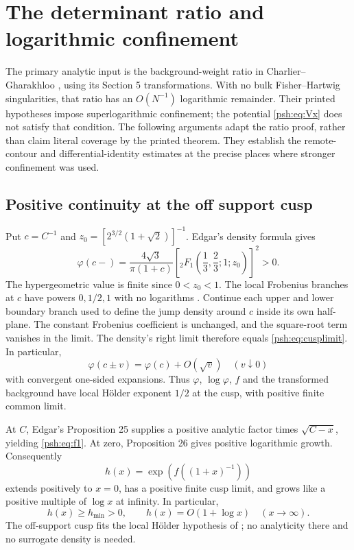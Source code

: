 \documentclass[11pt,a4paper]{article}
\numberwithin{equation}{section}
\theoremstyle{remark}\newtheorem{remark}[theorem]{Remark}
\begin{document}
\section{The determinant ratio and logarithmic confinement}\label{psh:sec:analytic}
The primary analytic input is the background-weight ratio in
Charlier--Gharakhloo \cite[Proposition 9.1 and (9.1)--(9.4)]{psh-cg}, using
its Section 5 transformations. With no bulk Fisher--Hartwig
singularities, that ratio has an $O(N^{-1})$ logarithmic remainder.
Their printed hypotheses impose superlogarithmic confinement; the
potential \eqref{psh:eq:Vx} does not satisfy that condition. The following
arguments adapt the ratio proof, rather than claim literal coverage by
the printed theorem. They establish the remote-contour and
differential-identity estimates at the precise places where stronger
confinement was used.

\subsection{Positive continuity at the off support cusp}
Put $c=C^{-1}$ and $z_0=[2^{3/2}(1+\sqrt2)]^{-1}$.
Edgar's density formula \cite[Proposition 23]{edgar} gives
\begin{equation}\label{psh:eq:cusplimit}
 \varphi(c-)=\frac{4\sqrt3}{\pi(1+c)}
 \left[{}_2F_1\left(\frac13,\frac23;1;z_0\right)\right]^2>0.
\end{equation}
The hypergeometric value is finite since $0<z_0<1$.
The local Frobenius branches at $c$ have powers $0,1/2,1$ with no
logarithms \cite[Proposition 4]{edgar}. Continue each upper and lower
boundary branch used to define the jump density around $c$ inside its
own half-plane. The constant Frobenius coefficient is unchanged, and the
square-root term vanishes in the limit. The density's right limit
therefore equals \eqref{psh:eq:cusplimit}. In particular,
\begin{equation}\label{psh:eq:holder}
 \varphi(c\pm v)=\varphi(c)+O(\sqrt v)\quad(v\downarrow0)
\end{equation}
with convergent one-sided expansions. Thus $\varphi$, $\log\varphi$, $f$
and the transformed background have local H\"older exponent $1/2$ at
the cusp, with positive finite common limit.

At $C$, Edgar's Proposition 25 supplies a positive analytic factor times
$\sqrt{C-x}$, yielding \eqref{psh:eq:f1}. At zero, Proposition 26 gives
positive logarithmic growth. Consequently
\[
 h(x)=\exp(f((1+x)^{-1}))
\]
extends positively to $x=0$, has a positive finite cusp limit, and grows
like a positive multiple of $\log x$ at infinity. In particular,
\begin{equation}\label{psh:eq:hbound}
 h(x)\geq h_{\min}>0,\qquad h(x)=O(1+\log x)\quad(x\to\infty).
\end{equation}
The off-support cusp fits the local H\"older hypothesis of \cite{psh-cg};
no analyticity there and no surrogate density is needed.
\end{document}
